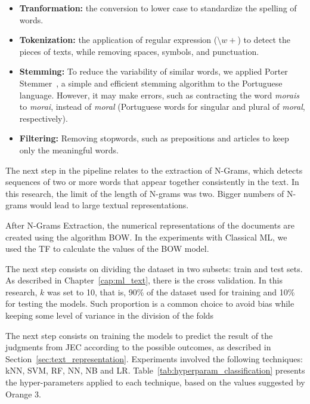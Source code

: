 \begin{itemize}[noitemsep]
    \item \textbf{Tranformation:} the conversion to lower case to standardize the spelling of words.
    \item \textbf{Tokenization:} the application of regular expression ($\setminus w+$) to detect the pieces of texts, while removing spaces, symbols, and punctuation.
    \item \textbf{Stemming:} To reduce the variability of similar words, we applied Porter Stemmer~\cite{Porter1980}, a simple and efficient stemming algorithm to the Portuguese language. However, it may make errors, such as contracting the word \textit{morais} to \textit{morai}, instead of \textit{moral} (Portuguese words for singular and plural of \textit{moral}, respectively).
    \item \textbf{Filtering:} Removing stopwords, such as prepositions and articles to keep only the meaningful words.
\end{itemize}


The next step in the pipeline relates to the extraction of N-Grams, which detects sequences of two or more words that appear together consistently in the text. In this research, the limit of the length of N-grams was two. Bigger numbers of N-grams would lead to large textual representations.



After N-Grams Extraction, the numerical representations of the documents are created using the algorithm \gls{BOW}. In the experiments with Classical \gls{ML}, we used the \gls{TF} to calculate the values of the BOW model. 


The next step consists on dividing the dataset in two subsets: train and test sets. As described in Chapter~\ref{cap:ml_text}, there is the cross validation. In this research, $k$ was set to 10, that is, 90\% of the dataset used for training and 10\% for testing the models. Such proportion is a common choice to avoid bias while keeping some level of variance in the division of the folds~\cite{Airola2011}

The next step consists on training the models to predict the result of the judgments from \gls{JEC} according to the possible outcomes, as described in Section~\ref{sec:text_representation}. 
Experiments involved the following techniques: \gls{kNN}, \gls{SVM}, \gls{RF}, \gls{NN}, \gls{NB} and \gls{LR}. Table~\ref{tab:hyperparam_classification} presents the hyper-parameters applied to each technique, based on the values suggested by Orange 3.


